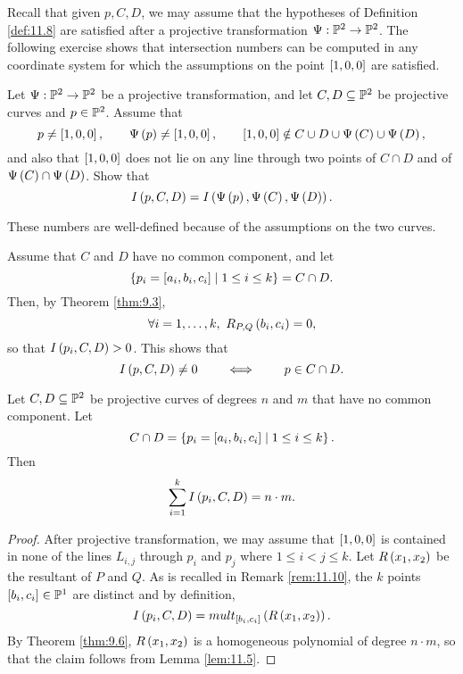 Recall that given $ p, C, D $, we may assume that the hypotheses of Definition \ref{def:11.8} are satisfied after a projective transformation $ \Psi : \P^2 \to \P^2 $. The following exercise shows that intersection numbers can be computed in any coordinate system for which the assumptions on the point $ \sb{1, 0, 0} $ are satisfied.

\begin{exercise}
Let $ \Psi : \P^2 \to \P^2 $ be a projective transformation, and let $ C, D \subseteq \P^2 $ be projective curves and $ p \in \P^2 $. Assume that
$$ p \ne \sb{1, 0, 0}, \qquad \Psi\rb{p} \ne \sb{1, 0, 0}, \qquad \sb{1, 0, 0} \notin C \cup D \cup \Psi\rb{C} \cup \Psi\rb{D}, $$
and also that $ \sb{1, 0, 0} $ does not lie on any line through two points of $ C \cap D $ and of $ \Psi\rb{C} \cap \Psi\rb{D} $. Show that
$$ I\rb{p, C, D} = I\rb{\Psi\rb{p}, \Psi\rb{C}, \Psi\rb{D}}. $$
\end{exercise}

\begin{note*}
These numbers are well-defined because of the assumptions on the two curves.
\end{note*}

\begin{remark}
\label{rem:11.10}
Assume that $ C $ and $ D $ have no common component, and let
$$ \cb{p_i = \sb{a_i, b_i, c_i} \mid 1 \le i \le k} = C \cap D. $$
Then, by Theorem \ref{thm:9.3},
$$ \forall i = 1, \dots, k, \ R_{P, Q}\rb{b_i, c_i} = 0, $$
so that $ I\rb{p_i, C, D} > 0 $. This shows that
$$ I\rb{p, C, D} \ne 0 \qquad \iff \qquad p \in C \cap D. $$
\end{remark}

\begin{theorem}
\label{thm:11.11}
Let $ C, D \subseteq \P^2 $ be projective curves of degrees $ n $ and $ m $ that have no common component. Let
$$ C \cap D = \cb{p_i = \sb{a_i, b_i, c_i} \mid 1 \le i \le k}. $$
Then
$$ \sum_{i = 1}^k I\rb{p_i, C, D} = n \cdot m. $$
\end{theorem}

\begin{proof}
After projective transformation, we may assume that $ \sb{1, 0, 0} $ is contained in none of the lines $ L_{i, j} $ through $ p_i $ and $ p_j $ where $ 1 \le i < j \le k $. Let $ R\rb{x_1, x_2} $ be the resultant of $ P $ and $ Q $. As is recalled in Remark \ref{rem:11.10}, the $ k $ points $ \sb{b_i, c_i} \in \P^1 $ are distinct and by definition,
$$ I\rb{p_i, C, D} = mult_{\sb{b_i, c_i}}\rb{R\rb{x_1, x_2}}. $$
By Theorem \ref{thm:9.6}, $ R\rb{x_1, x_2} $ is a homogeneous polynomial of degree $ n \cdot m $, so that the claim follows from Lemma \ref{lem:11.5}.
\end{proof}

